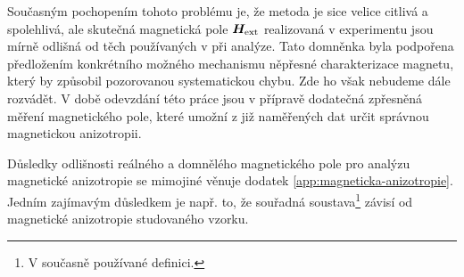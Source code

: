 Současným pochopením tohoto problému je, že metoda je sice velice citlivá a spolehlivá, ale skutečná magnetická pole $\bm{H}_\textrm{ext}$ realizovaná v experimentu jsou mírně odlišná od těch používaných v při analýze.
Tato domněnka byla podpořena předložením konkrétního možného mechanismu něpřesné charakterizace magnetu, který by způsobil pozorovanou systematickou chybu.
Zde ho však nebudeme dále rozvádět.
V době odevzdání této práce jsou v přípravě dodatečná zpřesněná měření magnetického pole, které umožní z již naměřených dat určit správnou magnetickou anizotropii.

Důsledky odlišnosti reálného a domnělého magnetického pole pro analýzu magnetické anizotropie se mimojiné věnuje dodatek \ref{app:magneticka-anizotropie}.
Jedním zajímavým důsledkem je např. to, že souřadná soustava\footnote{V současně používané definici.} závisí od magnetické anizotropie studovaného vzorku.
